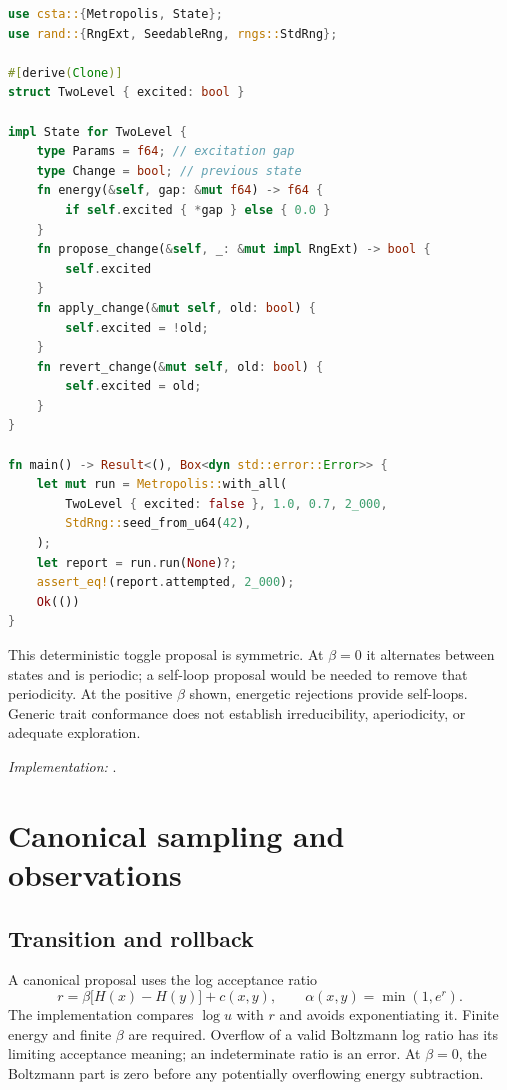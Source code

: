 \documentclass[11pt,a4paper,oneside]{report}
\newcommand{\src}[1]{\par{\small\textit{Implementation:} \path{#1}.}\par}
\begin{document}
\par\noindent\begin{minipage}{\linewidth}
\begin{lstlisting}[language=Rust,caption={A complete reversible two-level model.}]
use csta::{Metropolis, State};
use rand::{RngExt, SeedableRng, rngs::StdRng};

#[derive(Clone)]
struct TwoLevel { excited: bool }

impl State for TwoLevel {
    type Params = f64; // excitation gap
    type Change = bool; // previous state
    fn energy(&self, gap: &mut f64) -> f64 {
        if self.excited { *gap } else { 0.0 }
    }
    fn propose_change(&self, _: &mut impl RngExt) -> bool {
        self.excited
    }
    fn apply_change(&mut self, old: bool) {
        self.excited = !old;
    }
    fn revert_change(&mut self, old: bool) {
        self.excited = old;
    }
}

fn main() -> Result<(), Box<dyn std::error::Error>> {
    let mut run = Metropolis::with_all(
        TwoLevel { excited: false }, 1.0, 0.7, 2_000,
        StdRng::seed_from_u64(42),
    );
    let report = run.run(None)?;
    assert_eq!(report.attempted, 2_000);
    Ok(())
}
\end{lstlisting}
\end{minipage}\par

This deterministic toggle proposal is symmetric. At $\beta=0$ it alternates
between states and is periodic; a self-loop proposal would be needed to remove
that periodicity. At the positive $\beta$ shown, energetic rejections provide
self-loops. Generic trait conformance does not establish irreducibility,
aperiodicity, or adequate exploration.
\src{csta_metropolis/src/lib.rs}

\chapter{Canonical sampling and observations}\label{ch:canonical}
\section{Transition and rollback}
A canonical proposal uses the log acceptance ratio
\begin{equation}
 r=\beta\bigl[H(x)-H(y)\bigr]+c(x,y),\qquad
 \alpha(x,y)=\min(1,e^r).
\end{equation}
The implementation compares $\log u$ with $r$ and avoids exponentiating it.
Finite energy and finite $\beta$ are required. Overflow of a valid Boltzmann log
ratio has its limiting acceptance meaning; an indeterminate ratio is an error.
At $\beta=0$, the Boltzmann part is zero before any potentially overflowing energy
subtraction.
\end{document}
